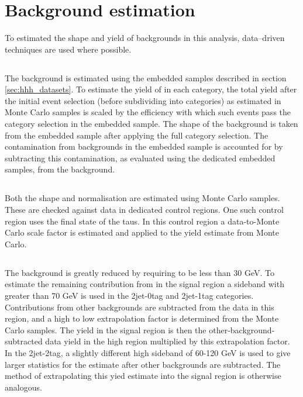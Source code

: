 \section{Background estimation}
\label{sec:hhh_backgrounds}
To estimated the shape and yield of backgrounds in this analysis, data--driven techniques are
used where possible. 

\subsection{\texorpdfstring{\Ztautau}{Z to tau tau}}
\label{sec:hhh_backgrounds_ztt}
The \Ztautau background is estimated using the embedded samples
described in section \ref{sec:hhh_datasets}. To estimate the 
yield of \Ztautau in each category, the total
yield after the initial event selection (before subdividing into categories) as
estimated in \Ztautau Monte Carlo samples is scaled by the efficiency with which 
such events pass the category selection in the embedded sample. The shape of
the \Ztautau background is taken from the embedded sample after applying the full
category selection. The contamination from \ttbar backgrounds in the embedded
sample is accounted for by subtracting this contamination, as evaluated using
the dedicated \ttbar embedded samples, from the \Ztautau background.

\subsection{\texorpdfstring{\ttbar}{ttbar}}
Both the \ttbar shape and normalisation are estimated using Monte Carlo samples.
These are checked against data in dedicated control regions. One such control
region uses the \emu final state of the taus. In this control region
a data-to-Monte Carlo scale factor is estimated and applied to the yield estimate from Monte Carlo.

\subsection{\texorpdfstring{\Wjets}{W + jets}}
\label{sec:hhh_backgrounds_wjets}
The \Wjets background is greatly reduced by requiring \mT to
be less than 30 GeV. To estimate the remaining contribution
from \Wjets in the signal region a sideband with \mT greater
than 70 GeV is used in the 2jet-0tag and 2jet-1tag categories.
Contributions from other backgrounds are subtracted 
from the data in this region, and a high \mT to low \mT
extrapolation factor is determined from the \Wjets Monte Carlo
samples. The yield in the signal region is then the other-background-subtracted
data yield in the high \mT region multiplied by this extrapolation factor.
In the 2jet-2tag, a slightly different high \mT sideband of 60-120 GeV is used 
to give larger statistics for the \Wjets estimate after other backgrounds are
subtracted. The method of extrapolating this yied estimate into
the signal region is otherwise analogous.

